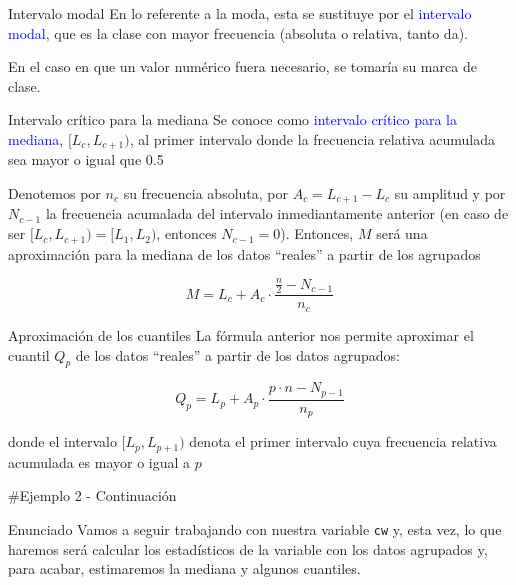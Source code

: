 \documentclass[
  ignorenonframetext,
]{beamer}
\newcommand\blue[1]{\textcolor{blue}{#1}}
\begin{document}
\begin{frame}{Intervalo modal}
\label{intervalo-modal}
En lo referente a la moda, esta se sustituye por el
\blue{intervalo modal}, que es la clase con mayor frecuencia (absoluta o
relativa, tanto da).

En el caso en que un valor numérico fuera necesario, se tomaría su marca
de clase.
\end{frame}

\begin{frame}{Intervalo crítico para la mediana}
\label{intervalo-cruxedtico-para-la-mediana}
Se conoce como \blue{intervalo crítico para la mediana},
\([L_c,L_{c+1})\), al primer intervalo donde la frecuencia relativa
acumulada sea mayor o igual que 0.5

Denotemos por \(n_c\) su frecuencia absoluta, por \(A_c = L_{c+1}-L_c\)
su amplitud y por \(N_{c-1}\) la frecuencia acumalada del intervalo
inmediantamente anterior (en caso de ser \([L_c,L_{c+1})=[L_1,L_2)\),
entonces \(N_{c-1}=0\)). Entonces, \(M\) será una aproximación para la
mediana de los datos ``reales'' a partir de los agrupados

\[M = L_c +A_c\cdot\frac{\frac{n}{2}-N_{c-1}}{n_c}\]
\end{frame}

\begin{frame}{Aproximación de los cuantiles}
\label{aproximaciuxf3n-de-los-cuantiles}
La fórmula anterior nos permite aproximar el cuantil \(Q_p\) de los
datos ``reales'' a partir de los datos agrupados:

\[Q_p = L_p +A_p\cdot\frac{p\cdot n-N_{p-1}}{n_p}\]

donde el intervalo \([L_p,L_{p+1})\) denota el primer intervalo cuya
frecuencia relativa acumulada es mayor o igual a \(p\)

\#Ejemplo 2 - Continuación
\end{frame}

\begin{frame}[fragile]{Enunciado}
\label{enunciado-3}
Vamos a seguir trabajando con nuestra variable \texttt{cw} y, esta vez,
lo que haremos será calcular los estadísticos de la variable con los
datos agrupados y, para acabar, estimaremos la mediana y algunos
cuantiles.
\end{frame}
\end{document}
